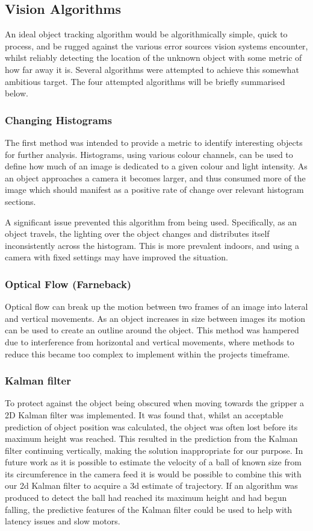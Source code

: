 \documentclass[conference]{IEEEtran}
\begin{document}
\subsection{Vision Algorithms}
An ideal object tracking algorithm would be algorithmically simple, quick to process, and be rugged against the various error sources vision systems encounter, whilst reliably detecting the location of the unknown object with some metric of how far away it is. Several algorithms were attempted to achieve this somewhat ambitious target. The four attempted algorithms will be briefly summarised below.

\subsubsection{Changing Histograms}
The first method was intended to provide a metric to identify interesting objects for further analysis. Histograms, using various colour channels, can be used to define how much of an image is dedicated to a given colour and light intensity. As an object approaches a camera it becomes larger, and thus consumed more of the image which should manifest as a positive rate of change over relevant histogram sections.

A significant issue prevented this algorithm from being used. Specifically, as an object travels, the lighting over the object changes and distributes itself inconsistently across the histogram. This is more prevalent indoors, and using a camera with fixed settings may have improved the situation.

\subsubsection{Optical Flow (Farneback)}
Optical flow can break up the motion between two frames of an image into lateral and vertical movements. As an object increases in size between images its motion can be used to create an outline around the object. This method was hampered due to interference from horizontal and vertical movements, where methods to reduce this became too complex to implement within the projects timeframe.

\subsubsection{Kalman filter}
To protect against the object being obscured when moving towards the gripper a 2D Kalman filter was implemented. It was found that, whilst an acceptable prediction of object position was calculated, the object was often lost before its maximum height was reached. This resulted in the prediction from the Kalman filter continuing vertically, making the solution inappropriate for our purpose. In future work as it is possible to estimate the velocity of a ball of known size from its circumference in the camera feed it is would be possible to combine this with our 2d Kalman filter to acquire a 3d estimate of trajectory. If an algorithm was produced to detect the ball had reached its maximum height and had begun falling, the predictive features of the Kalman filter could be used to help with latency issues and slow motors.
\end{document}
